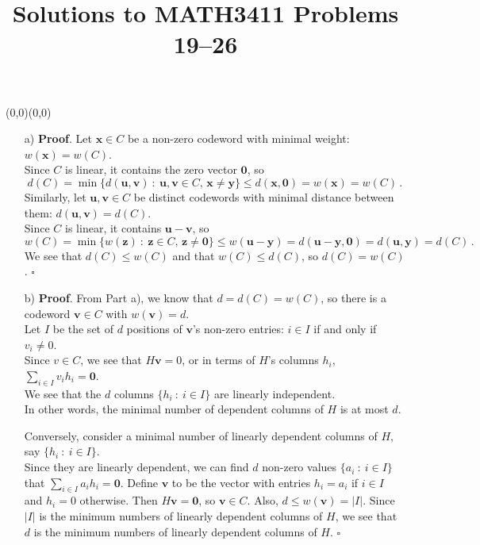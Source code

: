 \documentclass[11pt]{article}
\date{}
\author{}
\title{\sc Solutions to MATH3411 Problems 19--26}
\renewcommand{\vec}[1]{\mathbf{#1}}
\newcommand{\upabit}{\begin{picture}(0,0)(0,0)\end{picture}\vspace*{-5mm}}
\begin{document}
 \maketitle

\vspace*{-10mm}

\upabit
\begin{itemize}
  \item[{a)}] {\bf Proof}.
      Let $\vec{x}\in C$ be a non-zero codeword with minimal weight:
      $w(\vec{x}) = w(C)$.\\
      Since $C$ is linear, it contains the zero vector $\vec{0}$,
      so
      \[
          d(C)
        = \min\{d(\vec{u},\vec{v})\::\: \vec{u},\vec{v}\in C,\,\vec{x}\neq\vec{y}\}
        \leq d(\vec{x},\vec{0})
        = w(\vec{x})
        = w(C)\,.
      \]
      Similarly, let $\vec{u},\vec{v}\in C$ be distinct codewords
      with minimal distance between them: $d(\vec{u},\vec{v}) = d(C)$.\\
      Since $C$ is linear, it contains $\vec{u}-\vec{v}$,
      so
      \[
          w(C)
        = \min\{w(\vec{z})\::\: \vec{z}\in C,\,\vec{z}\neq\vec{0}\}
        \leq w(\vec{u}-\vec{y})
        = d(\vec{u}-\vec{y},\vec{0})
        = d(\vec{u},\vec{y})
        = d(C)\,.
      \]
      We see that $d(C)\leq w(C)$ and that $w(C)\leq d(C)$, so $d(C) = w(C)$. \hfill$\square$
  \item[{b)}] {\bf Proof}.
      From Part a), we know that $d = d(C) = w(C)$,
      so there is a codeword $\vec{v}\in C$ with $w(\vec{v}) = d$.\\
      Let $I$ be the set of $d$ positions of $\vec{v}$'s non-zero entries: $i\in I$ if and only if $v_i\neq 0$.\\
      Since $v\in C$, we see that $H\vec{v} = 0$,
      or in terms of $H$'s columns $h_i$,
      $\sum_{i\in I} v_ih_i = \vec{0}$.\\
      We see that the $d$ columns $\{h_i\::\: i\in I\}$ are linearly independent.\\
      In other words, the minimal number of dependent columns of $H$ is at most $d$.

      Conversely, consider a minimal number of linearly dependent columns of $H$,
      say $\{h_i\::\: i\in I\}$.\\
      Since they are linearly dependent,
      we can find $d$ non-zero values $\{a_i\::\: i\in I\}$
      that $\sum_{i\in I} a_ih_i = \vec{0}$.
      Define $\vec{v}$ to be the vector with entries $h_i = a_i$ if $i\in I$ and $h_i = 0$ otherwise.
      Then $H\vec{v} = \vec{0}$,
      so $\vec{v} \in C$.
      Also, $d \leq w(\vec{v}) = |I|$.
      Since $|I|$ is the minimum numbers of linearly dependent columns of $H$,
      we see that $d$ is the minimum numbers of linearly dependent columns of $H$.
      \hfill$\square$
\end{itemize}
\end{document}

